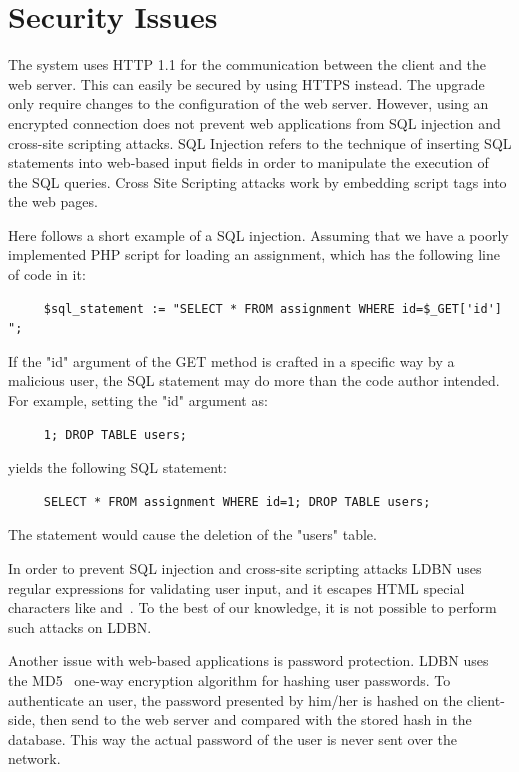\section{Security Issues}
The system uses HTTP 1.1 for the communication between the client and the web
server. This can easily be secured by using HTTPS instead. The upgrade only
require changes to the configuration of the web server. However, using an encrypted
connection does not prevent web applications from SQL injection and cross-site 
scripting attacks. SQL Injection refers to the technique of 
inserting SQL statements into web-based input fields in 
order to manipulate the execution of the SQL queries. Cross Site Scripting 
attacks work by embedding script tags into the web pages. 

Here follows a short example of a SQL injection.
Assuming that we have a poorly implemented PHP script for loading an assignment,
which has the following line of code in it:

\begin{verbatim}
     $sql_statement := "SELECT * FROM assignment WHERE id=$_GET['id'] ";
\end{verbatim}

\noindent If the "id" argument of the GET method is crafted in a specific way by a 
malicious user, the SQL statement may do more than the code author intended. 
For example, setting the "id" argument as:

\begin{verbatim}
     1; DROP TABLE users;
\end{verbatim}

\noindent yields the following SQL statement:

\begin{verbatim}
     SELECT * FROM assignment WHERE id=1; DROP TABLE users;
\end{verbatim}

\noindent The statement would cause the deletion of the "users" table. 

In order to prevent SQL injection and cross-site 
scripting attacks LDBN uses regular expressions for validating
user input, and it escapes HTML special characters like \lt and~\gt.
To the best of our knowledge, it is not possible to perform such attacks on LDBN.

Another issue with web-based applications is password protection. LDBN uses the 
MD5~\cite{w7} one-way encryption algorithm for hashing user passwords. 
To authenticate an user, the password presented by him/her is hashed on the client-side, 
then send to the web server and compared with the stored hash in the database. 
This way the actual password of the user is never sent over the network.
